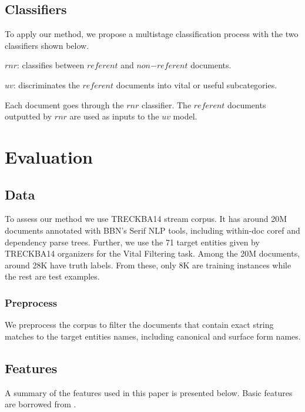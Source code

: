 \documentclass{article}
\begin{document}
\subsection{Classifiers}

To apply our method, we propose a multistage classification process with the two classifiers shown below.

\begin{itemize*}
    \item $rnr$: classifies between $referent$ and $non\mathord{-}referent$ documents.
    \item $uv$: discriminates the $referent$ documents into vital or useful subcategories.
\end{itemize*}

Each document goes through the $rnr$ classifier. The $referent$ documents outputted by $rnr$ are used as inputs to the $uv$ model.

\section{Evaluation}
\label{evaluation}

\subsection{Data}

To assess our method we use TRECKBA14 stream corpus. It has around 20M documents annotated with BBN's Serif NLP tools, including within-doc coref and dependency parse trees. Further, we use the 71 target entities given by TRECKBA14 organizers for the Vital Filtering task. Among the 20M documents, around 28K have truth labels. From these, only 8K are training instances while the rest are test examples.

\subsubsection{Preprocess}

We preprocess the corpus to filter the documents that contain exact string matches to the target entities names, including canonical and surface form names.

\subsection{Features}
\label{feat}

A summary of the features used in this paper is presented below. Basic features are borrowed from \cite{jingang13}.
\end{document}
